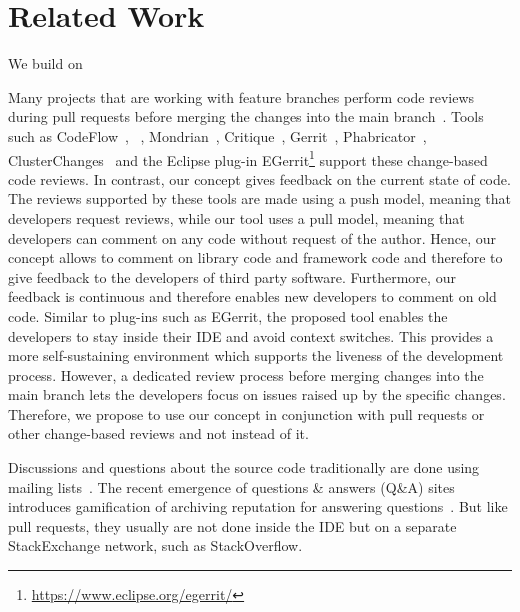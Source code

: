 
\section{Related Work}
We build on \cite{Duerschmid2017CCR}


Many projects that are working with feature branches perform code reviews during pull requests before merging the changes into the main branch~\cite{driessen2010successful, calefato2015PLE, yu2015pullrequests, tsay2014contributionGithub, gousios2014PullBasedSD, rahman2014pullrequests, tsay2014ContributionDiscussion, Sadowski2018Google}. 
%
Tools such as CodeFlow~\cite{bird2015CodeReviewPlatform}, ~\cite{kennedy2006Mondrian}, Mondrian~\cite{kennedy2006Mondrian}, Critique~\cite{Sadowski2018Google}, Gerrit~\cite{google2016gerrit},  Phabricator~\cite{tsotsis2011Phabricator}, ClusterChanges~\cite{barnett2015helpingdevelopers} and the Eclipse plug-in EGerrit\footnote{\url{https://www.eclipse.org/egerrit/}} support these change-based code reviews.
%
In contrast, our concept gives feedback on the current state of code. 
%
The reviews supported by these tools are made using a push model, meaning that developers request reviews, while our tool uses a pull model, meaning that developers can comment on any code without request of the author.
%
Hence, our concept allows to comment on library code and framework code and therefore to give feedback to the developers of third party software. 
%
Furthermore, our feedback is continuous and therefore enables new developers to comment on old code. 
%
Similar to plug-ins such as EGerrit, the proposed tool enables the developers to stay inside their IDE and avoid context switches.
%
This provides a more self-sustaining environment which supports the liveness of the development process. 
%
However, a dedicated review process before merging changes into the main branch lets the developers focus on issues raised up by the specific changes. 
%
Therefore, we propose to use our concept in conjunction with pull requests or other change-based reviews and not instead of it.
%

%
Discussions and questions about the source code traditionally are done using mailing lists~\cite{vasilescu2014QA}.
%
The recent emergence of questions \& answers (Q\&A) sites introduces gamification of archiving reputation for answering questions~\cite{vasilescu2014QA}.
%
But like pull requests, they usually are not done inside the IDE but on a separate StackExchange network, such as StackOverflow.